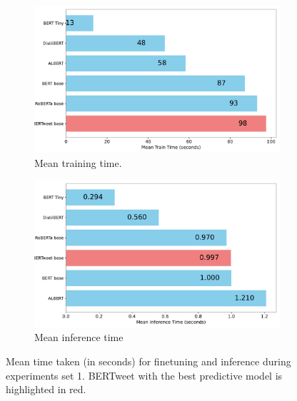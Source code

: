 \begin{figure}[htbp]
    \centering
    \captionsetup{font=small}
    \begin{subfigure}{0.49\textwidth}
        \centering
        \includegraphics[width=\linewidth]{figures/mean_train_time.pdf}
        \caption{Mean training time.}
        \label{fig: mean_train_time}
    \end{subfigure}
    \hfill
    \begin{subfigure}{0.49\textwidth}
        \centering
        \includegraphics[width=\linewidth]{figures/mean_inference_time.pdf}
        \caption{Mean inference time}
        \label{fig: mean_inf_time}
    \end{subfigure}
    \caption{Mean time taken (in seconds) for finetuning and inference during experiments set 1. BERTweet with the best predictive model is highlighted in red.}
    \label{fig: mean_time_taken}
\end{figure}

